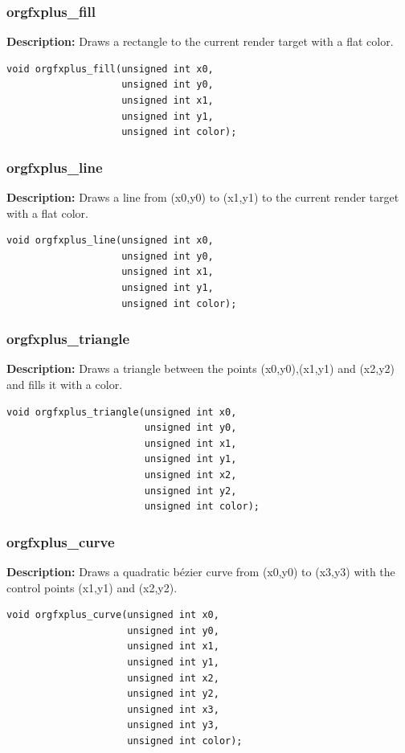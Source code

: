 \documentclass[10pt,a4paper]{article}
\begin{document}
\subsubsection{orgfxplus\_fill}
\textbf{Description:} Draws a rectangle to the current render target with a flat color.
\begin{lstlisting}
void orgfxplus_fill(unsigned int x0,
                    unsigned int y0,
                    unsigned int x1,
                    unsigned int y1,
                    unsigned int color);
\end{lstlisting}

\subsubsection{orgfxplus\_line}
\textbf{Description:} Draws a line from (x0,y0) to (x1,y1) to the current render target with a flat color.
\begin{lstlisting}
void orgfxplus_line(unsigned int x0,
                    unsigned int y0,
                    unsigned int x1,
                    unsigned int y1,
                    unsigned int color);
\end{lstlisting}

\subsubsection{orgfxplus\_triangle}
\textbf{Description:} Draws a triangle between the points (x0,y0),(x1,y1) and (x2,y2) and fills it with a color.
\begin{lstlisting}
void orgfxplus_triangle(unsigned int x0, 
                        unsigned int y0, 
                        unsigned int x1, 
                        unsigned int y1, 
                        unsigned int x2, 
                        unsigned int y2, 
                        unsigned int color);
\end{lstlisting}

\subsubsection{orgfxplus\_curve}
\textbf{Description:} Draws a quadratic bézier curve from (x0,y0) to (x3,y3) with the control points (x1,y1) and (x2,y2). 
\begin{lstlisting}
void orgfxplus_curve(unsigned int x0, 
                     unsigned int y0, 
                     unsigned int x1, 
                     unsigned int y1, 
                     unsigned int x2, 
                     unsigned int y2, 
                     unsigned int x3, 
                     unsigned int y3, 
                     unsigned int color);
\end{lstlisting}
\end{document}
